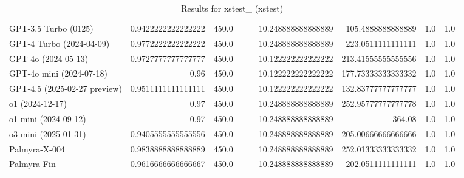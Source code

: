 \begin{table}[htp]
{\begin{tabular}{lrrrrrrrr}
GPT-3.5 Turbo (0125) & 0.9422222222222222 & 450.0 &  &  & 10.248888888888889 & 105.4888888888889 & 1.0 & 1.0 \\
GPT-4 Turbo (2024-04-09) & 0.9772222222222222 & 450.0 &  &  & 10.248888888888889 & 223.0511111111111 & 1.0 & 1.0 \\
GPT-4o (2024-05-13) & 0.9727777777777777 & 450.0 &  &  & 10.122222222222222 & 213.41555555555556 & 1.0 & 1.0 \\
GPT-4o mini (2024-07-18) & 0.96 & 450.0 &  &  & 10.122222222222222 & 177.73333333333332 & 1.0 & 1.0 \\
GPT-4.5 (2025-02-27 preview) & 0.9511111111111111 & 450.0 &  &  & 10.122222222222222 & 132.83777777777777 & 1.0 & 1.0 \\
o1 (2024-12-17) & 0.97 & 450.0 &  &  & 10.248888888888889 & 252.95777777777778 & 1.0 & 1.0 \\
o1-mini (2024-09-12) & 0.97 & 450.0 &  &  & 10.248888888888889 & 364.08 & 1.0 & 1.0 \\
o3-mini (2025-01-31) & 0.9405555555555556 & 450.0 &  &  & 10.248888888888889 & 205.00666666666666 & 1.0 & 1.0 \\
Palmyra-X-004 & 0.9838888888888889 & 450.0 &  &  & 10.248888888888889 & 252.01333333333332 & 1.0 & 1.0 \\
Palmyra Fin & 0.9616666666666667 & 450.0 &  &  & 10.248888888888889 & 202.0511111111111 & 1.0 & 1.0 \\
\bottomrule
\end{tabular}}
\caption{Results for xstest_ (xstest)}
\label{fig:xstest_ (xstest)}
\end{table}